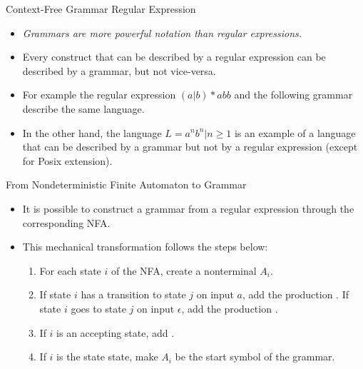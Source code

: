 \begin{bibunit}[apalike]
\tableofcontentslide[sections={1-4},sectionstyle={show/shaded},subsectionstyle={show/shaded/hide},subsubsectionstyle={show/show/hide/hide}]

\begin{frame}{Context-Free Grammar \vs Regular Expression}
	\begin{itemize}
	\item \emph{Grammars are more powerful notation than regular expressions.}
	\item Every construct that can be described by a regular expression can be described by a grammar, but not vice-versa.
	\item For example the regular expression $(a|b)*abb$ and the following grammar describe the same language. \\
		\begin{bnf}
		\end{bnf}
	\item In the other hand, the language $L = { a^nb^n | n \ge 1 }$ is an example of a language that can be described by a grammar but not by a regular expression (except for Posix extension).
	\end{itemize}
\end{frame}

\begin{frame}{From Nondeterministic Finite Automaton to Grammar}
	\begin{itemize}
	\item It is possible to construct a grammar from a regular expression through the corresponding NFA.
	\vfill
	\item This mechanical transformation follows the steps below: \begin{enumerate}
		\item For each state $i$ of the NFA, create a nonterminal $A_i$.
		\item If state $i$ has a transition to state $j$ on input $a$, add the production . If state $i$ goes to state $j$ on input $\epsilon$, add the production .
		\item If $i$ is an accepting state, add .
		\item If $i$ is the state state, make $A_i$ be the start symbol of the grammar.
		\end{enumerate}
	\end{itemize}
\end{frame}


\end{bibunit}
